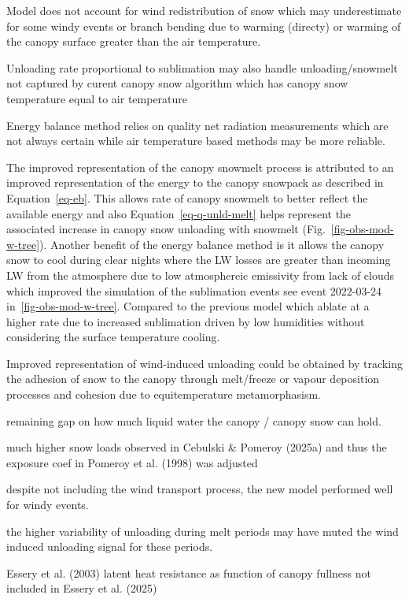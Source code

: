 \documentclass[
  letterpaper,
  DIV=11,
  numbers=noendperiod]{scrartcl}
\begin{document}
Model does not account for wind redistribution of snow which may
underestimate for some windy events or branch bending due to warming
(directy) or warming of the canopy surface greater than the air
temperature.

Unloading rate proportional to sublimation may also handle
unloading/snowmelt not captured by curent canopy snow algorithm which
has canopy snow temperature equal to air temperature

Energy balance method relies on quality net radiation measurements which
are not always certain while air temperature based methods may be more
reliable.

The improved representation of the canopy snowmelt process is attributed
to an improved representation of the energy to the canopy snowpack as
described in Equation~\ref{eq-eb}. This allows rate of canopy snowmelt
to better reflect the available energy and also
Equation~\ref{eq-q-unld-melt} helps represent the associated increase in
canopy snow unloading with snowmelt (Fig.~\ref{fig-obs-mod-w-tree}).
Another benefit of the energy balance method is it allows the canopy
snow to cool during clear nights where the LW losses are greater than
incoming LW from the atmosphere due to low atmosphereic emissivity from
lack of clouds which improved the simulation of the sublimation events
see event 2022-03-24 in~\ref{fig-obs-mod-w-tree}. Compared to the
previous model which ablate at a higher rate due to increased
sublimation driven by low humidities without considering the surface
temperature cooling.

Improved representation of wind-induced unloading could be obtained by
tracking the adhesion of snow to the canopy through melt/freeze or
vapour deposition processes and cohesion due to equitemperature
metamorphasism.

remaining gap on how much liquid water the canopy / canopy snow can
hold.

much higher snow loads observed in Cebulski \& Pomeroy (2025a) and thus
the exposure coef in Pomeroy et al. (1998) was adjusted

despite not including the wind transport process, the new model
performed well for windy events.

the higher variability of unloading during melt periods may have muted
the wind induced unloading signal for these periods.

Essery et al. (2003) latent heat resistance as function of canopy
fullness not included in Essery et al. (2025)
\end{document}

